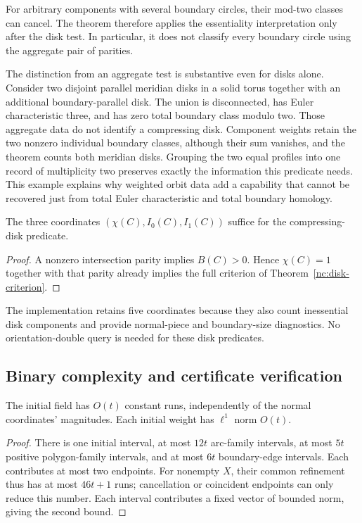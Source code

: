 For arbitrary components with several boundary circles, their
mod-two classes can cancel.  The theorem therefore applies the
essentiality interpretation only after the disk test.  In
particular, it does not classify every boundary circle using
the aggregate pair of parities.

The distinction from an aggregate test is substantive even for
disks alone.  Consider two disjoint parallel meridian disks in a
solid torus together with an additional boundary-parallel disk.
The union is disconnected, has Euler characteristic three, and
has zero total boundary class modulo two.  Those aggregate data
do not identify a compressing disk.  Component weights retain
the two nonzero individual boundary classes, although their sum
vanishes, and the theorem counts both meridian disks.  Grouping
the two equal profiles into one record of multiplicity two
preserves exactly the information this predicate needs.  This
example explains why weighted orbit data add a capability that
cannot be recovered just from total Euler characteristic and
total boundary homology.

\begin{corollary}\label{nc:three-coordinates}
The three coordinates $(\chi(C),I_0(C),I_1(C))$ suffice for the
compressing-disk predicate.
\end{corollary}
\begin{proof}
A nonzero intersection parity implies $B(C)>0$.  Hence
$\chi(C)=1$ together with that parity already implies the full
criterion of Theorem~\ref{nc:disk-criterion}.
\end{proof}

The implementation retains five coordinates because they also
count inessential disk components and provide normal-piece and
boundary-size diagnostics.  No orientation-double query is
needed for these disk predicates.

\subsection{Binary complexity and certificate verification}
\label{nc:complexity}

\begin{lemma}\label{nc:linear-runs}
The initial field has $O(t)$ constant runs, independently of the
normal coordinates' magnitudes.  Each initial weight has
$\ell^1$ norm $O(t)$.
\end{lemma}
\begin{proof}
There is one initial interval, at most $12t$ arc-family
intervals, at most $5t$ positive polygon-family intervals, and
at most $6t$ boundary-edge intervals.  Each contributes at most
two endpoints.  For nonempty $X$, their common refinement thus
has at most $46t+1$ runs; cancellation or coincident endpoints
can only reduce this number.  Each interval contributes a
fixed vector of bounded norm, giving the second bound.
\end{proof}

